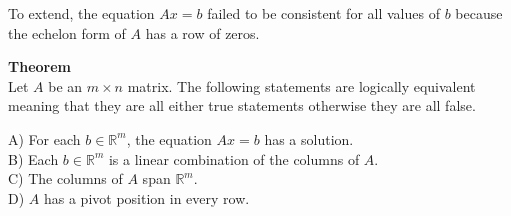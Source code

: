 \documentclass{article}
\begin{document}
  To extend, the equation $ Ax=b $ failed to be consistent for all values of $ b $ because the echelon form of $ A $ has a row of zeros. 

  \textbf{Theorem}\\
  Let $ A $ be an $ m \times n $ matrix. The following statements are logically equivalent meaning that they are all either true statements otherwise they are all false.

A) For each $ b \in \mathbb{R}^{m}$, the equation $ Ax=b $ has a solution.\\
  B) Each $ b \in \mathbb{R}^{m}$ is a linear combination of the columns of $ A $.\\
  C) The columns of $ A $ span $ \mathbb{R}^{m} $.\\
  D) $ A $ has a pivot position in every row. 
\end{document}
